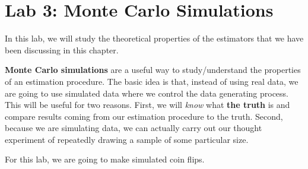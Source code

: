 \documentclass[
  letterpaper,
  DIV=11,
  numbers=noendperiod]{scrreprt}
\begin{document}
\section{Lab 3: Monte Carlo
Simulations}\label{lab-3-monte-carlo-simulations}

In this lab, we will study the theoretical properties of the estimators
that we have been discussing in this chapter.

\textbf{Monte Carlo simulations} are a useful way to study/understand
the properties of an estimation procedure. The basic idea is that,
instead of using real data, we are going to use simulated data where we
control the data generating process. This will be useful for two
reasons. First, we will \emph{know} what \textbf{the truth} is and
compare results coming from our estimation procedure to the truth.
Second, because we are simulating data, we can actually carry out our
thought experiment of repeatedly drawing a sample of some particular
size.

For this lab, we are going to make simulated coin flips.
\end{document}
